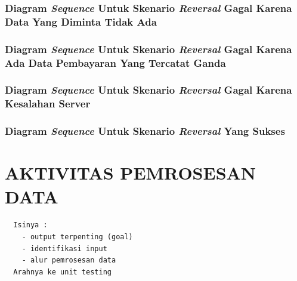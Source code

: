 \documentclass[pdftex,12pt, oneside]{article}
\begin{document}
\subsubsection{Diagram \textit{Sequence} Untuk Skenario \textit{Reversal} Gagal Karena Data Yang Diminta Tidak Ada}
\subsubsection{Diagram \textit{Sequence} Untuk Skenario \textit{Reversal} Gagal Karena Ada Data Pembayaran Yang Tercatat Ganda}
\subsubsection{Diagram \textit{Sequence} Untuk Skenario \textit{Reversal} Gagal Karena Kesalahan Server}
\subsubsection{Diagram \textit{Sequence} Untuk Skenario \textit{Reversal} Yang Sukses}


\section{AKTIVITAS PEMROSESAN DATA}

\begin{verbatim}
  Isinya :
    - output terpenting (goal)
    - identifikasi input 
    - alur pemrosesan data
  Arahnya ke unit testing
\end{verbatim}
\end{document}
